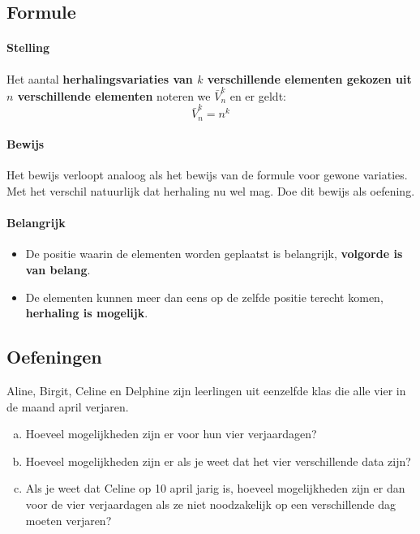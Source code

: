 \documentclass[12pt,a4,twoside]{article}
\begin{document}
\subsection{Formule}

\paragraph*{Stelling}
\begin{mdframed}
Het aantal {\bf herhalingsvariaties van $k$ verschillende elementen gekozen uit $n$ verschillende elementen} noteren we $\bar{V}^k_n$ en er geldt:
$$\bar{V}^k_n=n^k$$
\end{mdframed}

\paragraph*{Bewijs} Het bewijs verloopt analoog als het bewijs van de formule voor gewone variaties. Met het verschil natuurlijk dat herhaling nu wel mag. Doe dit bewijs als oefening.

\paragraph*{Belangrijk}
\begin{itemize}
  \item De positie waarin de elementen worden geplaatst is belangrijk, {\bf volgorde is van belang}.
  \item De elementen kunnen meer dan eens op de zelfde positie terecht komen, {\bf herhaling is mogelijk}.
\end{itemize}

\subsection{Oefeningen}

\begin{oefening}
Aline, Birgit, Celine en Delphine zijn leerlingen uit eenzelfde klas die alle vier in de maand april verjaren.
\begin{enumerate}[(a)]
  \item Hoeveel mogelijkheden zijn er voor hun vier verjaardagen?
  \item Hoeveel mogelijkheden zijn er als je weet dat het vier verschillende data zijn?
  \item Als je weet dat Celine op 10 april jarig is, hoeveel mogelijkheden zijn er dan voor de vier verjaardagen als ze niet noodzakelijk op een verschillende dag moeten verjaren?
\end{enumerate}
\end{oefening}
\end{document}
